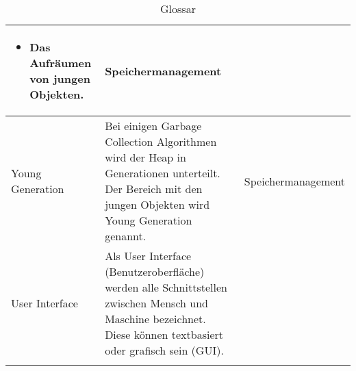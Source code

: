 \begin{longtable}{|p{4.5cm}|p{6cm}|p{4.1cm}|}
\begin{itemize}
	\item Das Aufräumen von jungen Objekten.
	\end{itemize}
	 & Speichermanagement\\\hline
  Young Generation &  Bei einigen Garbage Collection Algorithmen wird der Heap in Generationen unterteilt. Der Bereich mit den jungen Objekten wird Young Generation genannt.  & Speichermanagement \\\hline
User Interface &  Als User Interface (Benutzeroberfläche) werden alle Schnittstellen zwischen Mensch und Maschine bezeichnet. Diese können textbasiert oder grafisch sein (GUI). &  \\\hline
      \caption{Glossar}\\
  \end{longtable}


